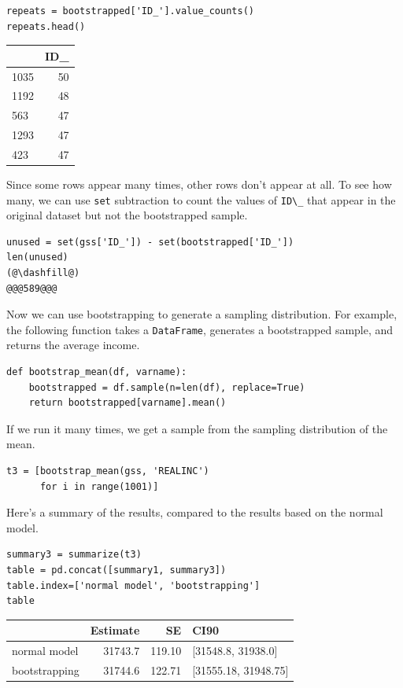 \begin{lstlisting}[]
repeats = bootstrapped['ID_'].value_counts()
repeats.head()
\end{lstlisting}

\begin{tabular}{lr}
\midrule
{} &  ID\_ \\
\midrule
1035 &   50 \\
1192 &   48 \\
563  &   47 \\
1293 &   47 \\
423  &   47 \\
\midrule
\end{tabular}

Since some rows appear many times, other rows don't appear at all. To
see how many, we can use \passthrough{\lstinline!set!} subtraction to
count the values of \passthrough{\lstinline!ID\_!} that appear in the
original dataset but not the bootstrapped sample.

\begin{lstlisting}[]
unused = set(gss['ID_']) - set(bootstrapped['ID_'])
len(unused)
(@\dashfill@)
@@@589@@@
\end{lstlisting}

Now we can use bootstrapping to generate a sampling distribution. For
example, the following function takes a
\passthrough{\lstinline!DataFrame!}, generates a bootstrapped sample,
and returns the average income.

\begin{lstlisting}[]
def bootstrap_mean(df, varname):
    bootstrapped = df.sample(n=len(df), replace=True)
    return bootstrapped[varname].mean()
\end{lstlisting}

If we run it many times, we get a sample from the sampling distribution
of the mean.

\begin{lstlisting}[]
t3 = [bootstrap_mean(gss, 'REALINC')
      for i in range(1001)]
\end{lstlisting}

Here's a summary of the results, compared to the results based on the
normal model.

\begin{lstlisting}[]
summary3 = summarize(t3)
table = pd.concat([summary1, summary3])
table.index=['normal model', 'bootstrapping']
table
\end{lstlisting}

\begin{tabular}{lrrl}
\midrule
{} &  Estimate &      SE &                  CI90 \\
\midrule
normal model  &   31743.7 &  119.10 &    [31548.8, 31938.0] \\
bootstrapping &   31744.6 &  122.71 &  [31555.18, 31948.75] \\
\midrule
\end{tabular}

